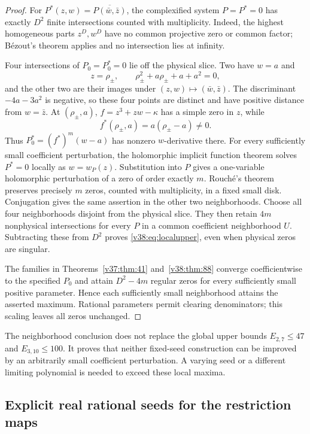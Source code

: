 \documentclass[UTF8,11pt]{ctexart}
\theoremstyle{definition}
\numberwithin{equation}{section}
\begin{document}
\begin{proof}
For $P^*(z,w)=\overline{P(\bar w,\bar z)}$, the complexified
system $P=P^*=0$ has exactly $D^2$ finite intersections counted
with multiplicity. Indeed, the highest homogeneous parts
$z^D,w^D$ have no common projective zero or common factor;
B\'ezout's theorem applies and no intersection lies at infinity.

Four intersections of $P_0=P_0^*=0$ lie off the physical slice.
Two have $w=a$ and
\[
 z=\rho_\pm,\qquad
 \rho_\pm^2+a\rho_\pm+a+a^2=0,
\]
and the other two are their images under
$(z,w)\mapsto(\bar w,\bar z)$. The discriminant
$-4a-3a^2$ is negative, so these four points are distinct and
have positive distance from $w=\bar z$.
At $(\rho_\pm,a)$, $f=z^3+zw-\kappa$ has a simple zero in
$z$, while
\[
 f^*(\rho_\pm,a)=a(\rho_\pm-a)\ne0.
\]
Thus $P_0^*=(f^*)^m(w-a)$ has nonzero $w$-derivative there.
For every sufficiently small coefficient perturbation, the
holomorphic implicit function theorem solves $P^*=0$ locally
as $w=w_P(z)$. Substitution into $P$ gives a one-variable
holomorphic perturbation of a zero of order exactly $m$.
Rouch\'e's theorem preserves precisely $m$ zeros, counted with
multiplicity, in a fixed small disk. Conjugation gives the
same assertion in the other two neighborhoods. Choose all four
neighborhoods disjoint from the physical slice. They then retain
$4m$ nonphysical intersections for every $P$ in a common
coefficient neighborhood $U$. Subtracting these from $D^2$
proves \eqref{v38:eq:localupper}, even when physical zeros
are singular.

The families in Theorems~\ref{v37:thm:41} and~\ref{v38:thm:88}
converge coefficientwise to the specified $P_0$ and attain
$D^2-4m$ regular zeros for every sufficiently small positive
parameter. Hence each sufficiently small neighborhood attains
the asserted maximum. Rational parameters permit clearing
denominators; this scaling leaves all zeros unchanged.
\end{proof}

The neighborhood conclusion does not replace the global upper
bounds $E_{2,7}\le47$ and $E_{3,10}\le100$. It proves that
neither fixed-seed construction can be improved by an
arbitrarily small coefficient perturbation. A varying seed or
a different limiting polynomial is needed to exceed these
local maxima.


\subsection{Explicit real rational seeds for the restriction maps}
\label{v42:sec:realseeds}
\end{document}
